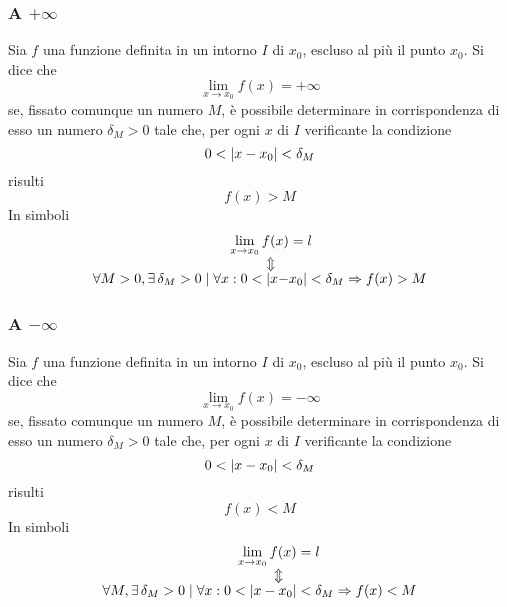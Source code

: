 \subsubsection{A $+\infty$}
\begin{definizioneLimiteInfinito1}
	Sia $f$ una funzione definita in un intorno $I$ di $x_0$, escluso al più il punto $x_0$. Si dice
	che
	\begin{equation*}
	\lim\limits_{x\to x_0}f(x)=+\infty
	\end{equation*}
	se, fissato comunque un numero $M$, è possibile determinare in corrispondenza di esso un numero
	$\delta_M>0$ tale che, per ogni $x$ di $I$ verificante la condizione
	\begin{equation*}
	0<\lvert x-x_0\rvert<\delta_M
	\end{equation*}
	risulti
	\begin{equation*}
	f(x)>M
	\end{equation*}
	In simboli
	\begin{align*}
	\lim\limits_{x\to x_0} f(x) &= l\\
	\ArrowBetweenLines
	\forall M>0, \exists\,\delta_M>0\mid\forall x: 0<\vert x-&x_0\vert < \delta_M \Rightarrow
	f(x) > M
	\end{align*}
\end{definizioneLimiteInfinito1}
\subsubsection{A $-\infty$}
\begin{definizioneLimiteInfinito2}
	Sia $f$ una funzione definita in un intorno $I$ di $x_0$, escluso al più il punto $x_0$. Si dice
	che
	\begin{equation*}
	\lim\limits_{x\to x_0}f(x)=-\infty
	\end{equation*}
	se, fissato comunque un numero $M$, è possibile determinare in corrispondenza di esso un numero
	$\delta_M>0$ tale che, per ogni $x$ di $I$ verificante la condizione
	\begin{equation*}
	0<\lvert x-x_0\rvert<\delta_M
	\end{equation*}
	risulti
	\begin{equation*}
	f(x)<M
	\end{equation*}
	In simboli
	\begin{align*}
	\lim\limits_{x\to x_0} f(x) &= l\\
	\ArrowBetweenLines
	\forall M, \exists\,\delta_M>0\mid\forall x: 0<\vert x-x_0\vert &< \delta_M \Rightarrow
	f(x) < M
		\end{align*}
\end{definizioneLimiteInfinito2}

